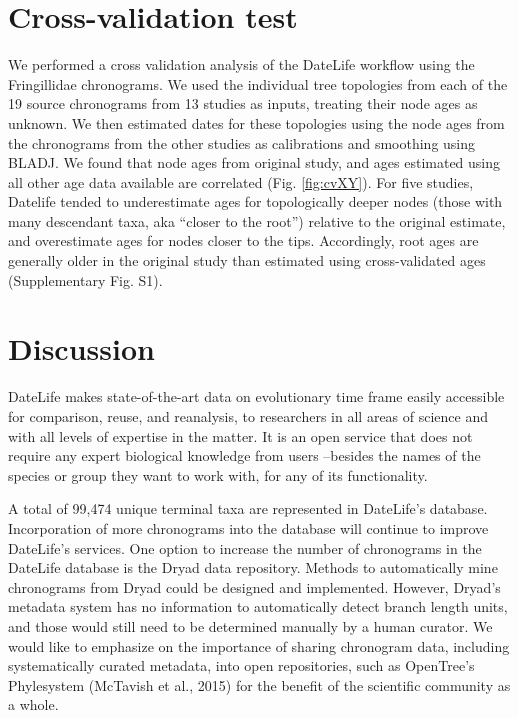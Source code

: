 \documentclass[english,man]{apa6}
\begin{document}
\hypertarget{cross-validation-test}{%
\section{Cross-validation test}\label{cross-validation-test}}

We performed a cross validation analysis of the DateLife workflow using the Fringillidae chronograms.
We used the individual tree topologies from each of the 19 source chronograms from 13 studies as inputs, treating their node ages as unknown.
We then estimated dates for these topologies using the node ages from the chronograms from the other studies as calibrations and smoothing using BLADJ.
We found that node ages from original study, and ages estimated using all other age data available are correlated (Fig. \ref{fig:cvXY}).
For five studies, Datelife tended to underestimate ages for topologically deeper nodes (those with many descendant taxa, aka \enquote{closer to the root}) relative to the original estimate, and overestimate ages for nodes closer to the tips.
Accordingly, root ages are generally older in the original study than estimated using cross-validated ages (Supplementary Fig. S1).

\hypertarget{discussion}{%
\section{Discussion}\label{discussion}}

DateLife makes state-of-the-art data on evolutionary time frame easily accessible for comparison, reuse, and reanalysis, to researchers in all areas of science and with all levels of expertise in the matter. It is an open service that does not require any expert biological knowledge from users --besides the names of the species or group they want to work with, for any of its functionality.

A total of 99,474 unique terminal taxa are represented in DateLife's database.
Incorporation of more chronograms into the database will continue to improve DateLife's services. One option to increase the number of chronograms in the DateLife database is the Dryad data repository. Methods to automatically mine chronograms from Dryad could be designed and implemented. However, Dryad's metadata system has no information to automatically detect branch length units, and those would still need to be determined manually by a human curator.
We would like to emphasize on the importance of sharing chronogram data, including systematically curated metadata, into open repositories, such as OpenTree's Phylesystem (McTavish et al., 2015) for the benefit of the scientific community as a whole.
\end{document}
